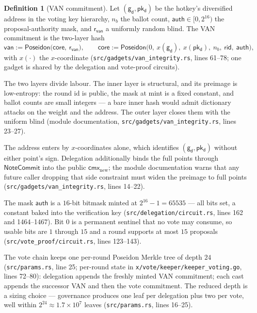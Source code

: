 \documentclass[11pt,a4paper]{article}
\theoremstyle{definition}
\newtheorem{definition}[theorem]{Definition}
\newcommand{\cmx}{\mathsf{cmx}}
\newcommand{\NoteCommit}{\ensuremath{\mathsf{NoteCommit}}}
\newcommand{\pkd}{\ensuremath{\mathsf{pk_d}}}
\newcommand{\gd}{\ensuremath{\mathsf{g_d}}}
\begin{document}
\begin{definition}[VAN commitment]\label{def:vote-van}
Let $(\gd, \pkd)$ be the hotkey's diversified address in the voting key
hierarchy, $n_b$ the ballot count, $\mathsf{auth} \in [0, 2^{16})$ the
proposal-authority mask, and $\mathsf{r}_{\mathsf{van}}$ a uniformly random
blind. The VAN commitment is the two-layer hash
\[
\mathsf{van} := \mathsf{Poseidon}\bigl(\mathsf{core},\
\mathsf{r}_{\mathsf{van}}\bigr), \qquad
\mathsf{core} := \mathsf{Poseidon}\bigl(0,\ x(\gd),\ x(\pkd),\ n_b,\
\mathsf{rid},\ \mathsf{auth}\bigr),
\]
with $x(\cdot)$ the $x$-coordinate
(\texttt{src/gadgets/van\_integrity.rs}, lines 61--78; one gadget is shared
by the delegation and vote-proof circuits).
\end{definition}

The two layers divide labour. The inner layer is structural, and its preimage
is low-entropy: the round id is public, the mask at mint is a fixed constant,
and ballot counts are small integers --- a bare inner hash would admit
dictionary attacks on the weight and the address. The outer layer closes them
with the uniform blind (module documentation,
\texttt{src/gadgets/van\_integrity.rs}, lines 23--27).

The address enters by $x$-coordinates alone, which identifies
$(\gd, \pkd)$ without either point's sign. Delegation additionally binds
the full points through \NoteCommit{}
into the public $\cmx_{\mathrm{new}}$; the module documentation warns that
any future caller dropping that side constraint must widen the preimage to
full points (\texttt{src/gadgets/van\_integrity.rs}, lines 14--22).

The mask $\mathsf{auth}$ is a $16$-bit bitmask minted at
$2^{16} - 1 = 65535$ --- all bits set, a constant baked into the verification
key (\texttt{src/\allowbreak delegation/\allowbreak circuit.rs}, lines 162 and
1464--1467). Bit $0$
is a
permanent sentinel that no vote may consume, so usable bits are $1$ through
$15$ and a round supports at most $15$ proposals
(\texttt{src/vote\_proof/circuit.rs}, lines 123--143).

The vote chain keeps one per-round Poseidon Merkle tree of depth $24$
(\texttt{src/params.rs}, line 25; per-round state in
\texttt{x/vote/keeper/keeper\_voting.go}, lines 72--80): delegation appends
the freshly minted VAN commitment; each cast appends the successor VAN and
then the vote commitment. The reduced depth is a sizing choice ---
governance produces one leaf per delegation plus two per vote, well within
$2^{24} \approx 1.7 \times 10^{7}$ leaves (\texttt{src/params.rs}, lines
16--25).
\end{document}
